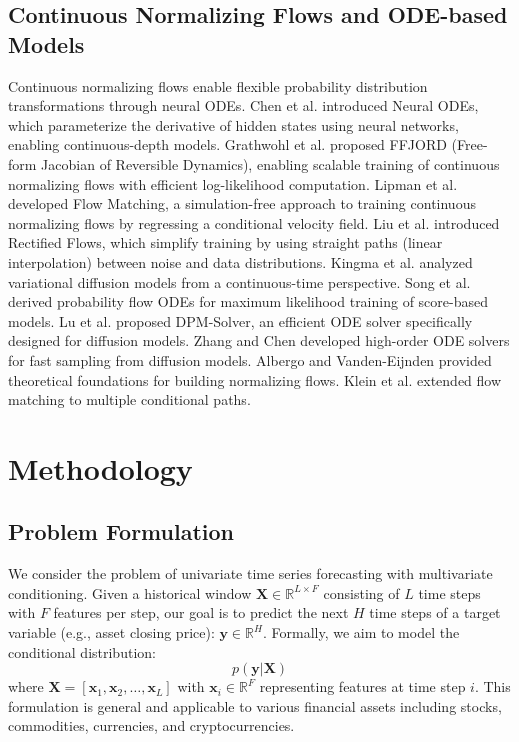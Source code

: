 \documentclass[11pt,a4paper]{article}
\begin{document}
\subsection{Continuous Normalizing Flows and ODE-based Models}

Continuous normalizing flows enable flexible probability distribution transformations through neural ODEs. Chen et al. \cite{chen2018neural} introduced Neural ODEs, which parameterize the derivative of hidden states using neural networks, enabling continuous-depth models. Grathwohl et al. \cite{grathwohl2019ffjord} proposed FFJORD (Free-form Jacobian of Reversible Dynamics), enabling scalable training of continuous normalizing flows with efficient log-likelihood computation. Lipman et al. \cite{lipman2022flow} developed Flow Matching, a simulation-free approach to training continuous normalizing flows by regressing a conditional velocity field. Liu et al. \cite{liu2023rectified} introduced Rectified Flows, which simplify training by using straight paths (linear interpolation) between noise and data distributions. Kingma et al. \cite{kingma2021variational} analyzed variational diffusion models from a continuous-time perspective. Song et al. \cite{song2021maximum} derived probability flow ODEs for maximum likelihood training of score-based models. Lu et al. \cite{lu2022dpm} proposed DPM-Solver, an efficient ODE solver specifically designed for diffusion models. Zhang and Chen \cite{zhang2022fast} developed high-order ODE solvers for fast sampling from diffusion models. Albergo and Vanden-Eijnden \cite{albergo2023building} provided theoretical foundations for building normalizing flows. Klein et al. \cite{klein2024multiflow} extended flow matching to multiple conditional paths.

\section{Methodology}

\subsection{Problem Formulation}

We consider the problem of univariate time series forecasting with multivariate conditioning. Given a historical window $\mathbf{X} \in \mathbb{R}^{L \times F}$ consisting of $L$ time steps with $F$ features per step, our goal is to predict the next $H$ time steps of a target variable (e.g., asset closing price): $\mathbf{y} \in \mathbb{R}^H$. Formally, we aim to model the conditional distribution:
\begin{equation}
    p(\mathbf{y} | \mathbf{X})
\end{equation}
where $\mathbf{X} = [\mathbf{x}_1, \mathbf{x}_2, \ldots, \mathbf{x}_L]$ with $\mathbf{x}_i \in \mathbb{R}^F$ representing features at time step $i$. This formulation is general and applicable to various financial assets including stocks, commodities, currencies, and cryptocurrencies.
\end{document}
